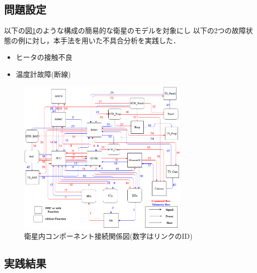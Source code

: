 \documentclass[11pt]{jsarticle}%
\begin{document}
\begin{multicols}{2}
  \subsection{問題設定}
  \vspace{-1zh}
  以下の図\ref{fig:satellite}のような構成の簡易的な衛星のモデルを対象にし
  以下の2つの故障状態の例に対し，本手法を用いた不具合分析を実践した．
  \begin{itemize}
   \item ヒータの接触不良
   \item 温度計故障(断線)
 \end{itemize}
  \begin{figure}[H]
    \centering
      \includegraphics[height=7.5cm]{../figure/satellite_diagram.png}
      \caption{衛星内コンポーネント接続関係図(数字はリンクのID)}
      \label{fig:satellite}
  \end{figure}
  \vspace{-1zh}
\subsection{実践結果}
  \vspace{-1zh}

\end{multicols}
\end{document}
